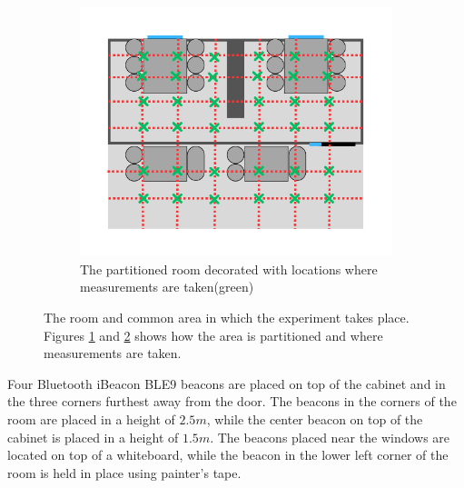 \begin{figure}
\begin{subfigure}[b]{0.49\textwidth}
        \label{fig:room_partition}
    \end{subfigure}
    \begin{subfigure}[b]{0.49\textwidth}
        \centering
        \includegraphics[width=\textwidth]{images/roomwithgridandmeasurements.png}
        \caption{The partitioned room decorated with locations where measurements are taken(green)}
        \label{fig:room_partition_measurements}
    \end{subfigure}
    \caption{The room and common area in which the experiment takes place. Figures \ref{fig:room_partition} and \ref{fig:room_partition_measurements} shows how the area is partitioned and where measurements are taken.}
    \label{fig:allfiguresForTheGridPartition}
\end{figure}

Four Bluetooth iBeacon BLE9 beacons \cite{BluetoothiBeaconBLE9} are placed on top of the cabinet and in the three corners furthest away from the door. 
The beacons in the corners of the room are placed in a height of $2.5m$, while the center beacon on top of the cabinet is placed in a height of $1.5m$.   
The beacons placed near the windows are located on top of a whiteboard, while the beacon in the lower left corner of the room is held in place using painter's tape.






